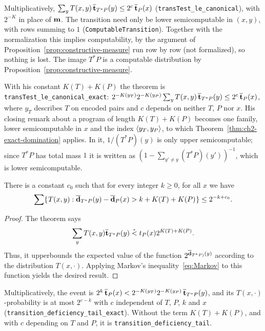 \begin{formalization}
Multiplicatively, \( \sum_{y} T(x,y)\, \overline{\mathbf{t}}_{T^{*}P}(y) \le 2^{c}\, \overline{\mathbf{t}}_{P}(x) \)
(\texttt{transTest\_le\_canonical}), with \( 2^{-K} \) in place of \( \mathbf{m} \). The transition
need only be lower semicomputable in \( (x,y) \), with rows summing to \( 1 \)
(\texttt{ComputableTransition}). Together with the normalization this implies computability,
by the argument of Proposition~\ref{prop:constructive-measure} run row by row (not
formalized), so nothing is lost. The image \( T^{*}P \) is a computable distribution by
Proposition~\ref{prop:constructive-measure}.

With his constant \( K(T) + K(P) \) the theorem is \texttt{transTest\_le\_canonical\_exact}:
\( 2^{-K(y_{T})} 2^{-K(y_{P})} \sum_{y} T(x,y)\, \overline{\mathbf{t}}_{T^{*}P}(y) \le 2^{c}\, \overline{\mathbf{t}}_{P}(x) \),
where \( y_{T} \) describes \( T \) on encoded pairs and \( c \) depends on neither \( T \),
\( P \) nor \( x \). His closing remark about a program of length \( K(T) + K(P) \) becomes one
family, lower semicomputable in \( x \) and the index \( {\mathopen\langle y_{T}, y_{P}\mathclose\rangle} \), to which
Theorem~\ref{thm:ch2-exact-domination} applies. In it, \( 1/(T^{*}P)(y) \) is only upper
semicomputable; since \( T^{*}P \) has total mass \( 1 \) it is written as
\( (1 - \sum_{y' \ne y} (T^{*}P)(y'))^{-1} \), which is lower semicomputable.
\end{formalization}

 \begin{corollary}
  \label{cor:g2.2.8}
  \leanok
There is a constant $c_{0}$
such that for every integer $k \ge 0$, for all $x$ we have
 \[
 \sum\mathopen\{\mskip 1mu T(x, y) : \overline{\mathbf{d}}_{T^{*}P}(y) - \overline{\mathbf{d}}_{P}(x) > k + K(T) + K(P)\mskip 1mu\mathclose\}
 \le 2^{-k + c_{0}}.
 \]
 \end{corollary}
 \begin{proof}
  \leanok
The theorem says
 \[
  \sum_{y} T(x, y) \overline{\mathbf{t}}_{T^{*} P}(y) \stackrel{{}_*}{<} t_{P}(x)2^{K(T) + K(P)}.
 \]
Thus, it upperbounds the expected value of
the function  $2^{\overline{\mathbf{d}}_{T^{*}P)}(y)}$ according to the distribution $T(x, \cdot)$.
Applying Markov's inequality~\eqref{eq:Markov}
to this function yields the desired result.
 \end{proof}

\begin{formalization}
Multiplicatively, the event is
\( 2^{k}\, \overline{\mathbf{t}}_{P}(x) < 2^{-K(y_{T})} 2^{-K(y_{P})}\, \overline{\mathbf{t}}_{T^{*}P}(y) \), and its
\( T(x,\cdot) \)-probability is at most \( 2^{c-k} \) with \( c \) independent of \( T \),
\( P \), \( k \) and \( x \) (\texttt{transition\_deficiency\_tail\_exact}). Without the term
\( K(T) + K(P) \), and with \( c \) depending on \( T \) and \( P \), it is
\texttt{transition\_deficiency\_tail}.
\end{formalization}

